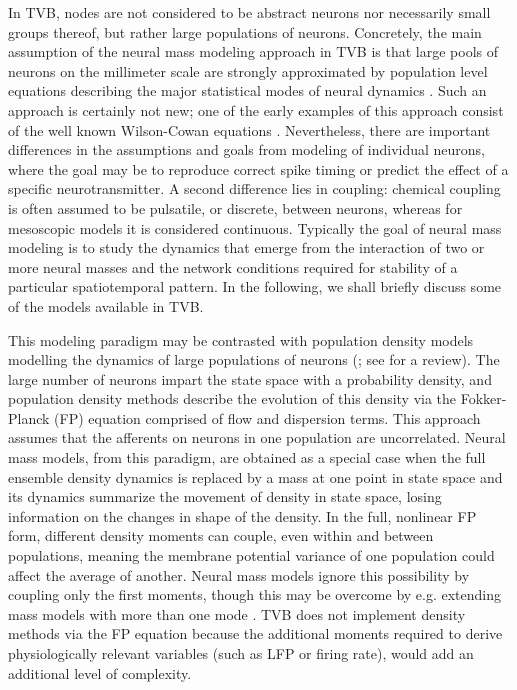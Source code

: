 \documentclass{bioinfo}
\begin{document}
In TVB, nodes are not considered to be abstract neurons nor necessarily small
groups thereof, but rather large populations of neurons. Concretely, the main
assumption of the neural mass modeling approach in TVB is that large pools of
neurons on the millimeter scale are strongly approximated by population level
equations describing the major statistical modes of neural dynamics
\citep{Freeman_1975book}. Such an approach is certainly not new; one of the
early examples of this approach consist of the well known Wilson-Cowan
equations \citep{Wilson_1973}. Nevertheless, there are important differences in
the assumptions and goals from modeling of individual neurons, where the goal
may be to reproduce correct spike timing or predict the effect of  a specific
neurotransmitter. A second difference lies in coupling: chemical coupling is
often assumed to be pulsatile, or discrete, between neurons, whereas for
mesoscopic models it is considered continuous. Typically the goal of neural
mass modeling is to study the dynamics that emerge from the interaction of two
or more neural masses and the network conditions required for stability of a
particular spatiotemporal pattern. In the following, we shall  briefly discuss
some of the models available in TVB.

This modeling paradigm may be contrasted with population density models modelling the
dynamics of large populations of neurons
(\cite{de1993stochastical, omurtag2000simulation, knight2000dynamics,
gerstner2000population}; see \cite{Deco_2008a} for a review).  The large number
of neurons impart the state space with a probability density, and population
density methods describe the evolution of this density via the Fokker-Planck
(FP) equation \citep{risken1996fokker} comprised of flow and dispersion terms.
This approach assumes that the afferents on neurons in one population are
uncorrelated.  Neural mass models, from this paradigm, are obtained as a
special case when the full ensemble density dynamics is replaced by a mass at
one point in state space and its dynamics summarize the movement of density in
state space, losing information on the changes in shape of the density.  In the
full, nonlinear FP form, different density moments can couple, even within and
between populations, meaning the membrane potential variance of one population
could affect the average of another. Neural mass models ignore this possibility
by coupling only the first moments, though this may be overcome by e.g.
extending mass models with more than one mode \citep{Stefanescu_2008,
Stefanescu_2011}.  TVB does not implement density methods via the FP equation
because the additional moments required to derive physiologically relevant
variables (such as LFP or firing rate), would add an additional level of
complexity.  
\end{document}
